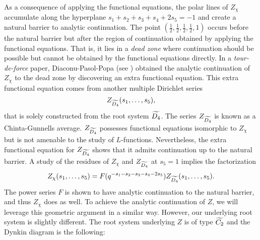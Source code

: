 \documentclass[12pt,reqno,oneside]{amsart}
\begin{document}
 As a consequence of applying the functional equations, the polar lines of $Z_{\chi}$ accumulate along the hyperplane $s_{1}+s_{2}+s_{3}+s_{4}+2s_{5} = -1$ and create a natural barrier to analytic continuation. The point $\left(\frac{1}{2},\frac{1}{2},\frac{1}{2},\frac{1}{2},1\right)$ occurs before the natural barrier but after the region of continuation obtained by applying the functional equations. That is, it lies in a \textit{dead zone} where continuation should be possible but cannot be obtained by the functional equations directly. In a \textit{tour-de-force} paper, Diaconu-Pasol-Popa (see \cite{DPP}) obtained the analytic continuation of $Z_{\chi}$ to the dead zone by discovering an extra functional equation. This extra functional equation comes from another multiple Dirichlet series
 \[
  Z_{\widetilde{D_{4}}}(s_{1},\ldots,s_{5}),
 \]
 that is solely constructed from the root system $\widetilde{D_{4}}$. The series $Z_{\widetilde{D_{4}}}$ is known as a Chinta-Gunnells average. $Z_{\widetilde{D_{4}}}$ possesses functional equations isomorphic to $Z_{\chi}$ but is not amenable to the study of $L$-functions. Nevertheless, the extra functional equation for $Z_{\widetilde{D_{4}}}$ shows that it admits continuation up to the natural barrier. A study of the residues of $Z_{\chi}$ and $Z_{\widetilde{D_{4}}}$ at $s_{5} = 1$ implies the factorization
\begin{equation}\label{equ:factorization}
  Z_{\chi}(s_{1},\ldots,s_{5}) = F(q^{-s_{1}-s_{2}-s_{3}-s_{4}-2s_{5}})Z_{\widetilde{D_{4}}}(s_{1},\ldots,s_{5}).
\end{equation}
The power series $F$ is shown to have analytic continuation to the natural barrier, and thus $Z_{\chi}$ does as well. To achieve the analytic continuation of $Z$, we will leverage this geometric argument in a similar way. However, our underlying root system is slightly different. The root system underlying $Z$ is of type $\widetilde{C_{2}}$ and the Dynkin diagram is the following:

\begin{center}
\end{center}
\end{document}
